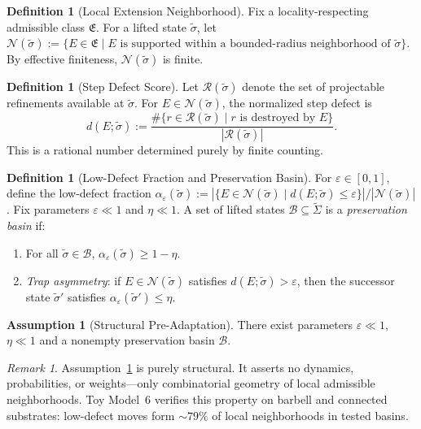 \documentclass[11pt,a4paper]{article}
\theoremstyle{definition}
\newtheorem{definition}[theorem]{Definition}
\newtheorem{assumption}[theorem]{Assumption}
\theoremstyle{remark}
\newtheorem{remark}[theorem]{Remark}
\begin{document}
\begin{definition}[Local Extension Neighborhood]\label{def:neigh}
Fix a locality-respecting admissible class $\mathfrak{E}$. For a lifted state $\tilde{\sigma}$, let $\mathcal{N}(\tilde{\sigma}) := \{ E \in \mathfrak{E} \mid E \text{ is supported within a bounded-radius neighborhood of } \tilde{\sigma} \}$. By effective finiteness, $\mathcal{N}(\tilde{\sigma})$ is finite.
\end{definition}

\begin{definition}[Step Defect Score]\label{def:stepdefect}
Let $\mathcal{R}(\tilde{\sigma})$ denote the set of projectable refinements available at $\tilde{\sigma}$. For $E \in \mathcal{N}(\tilde{\sigma})$, the normalized step defect is
\[
  d(E; \tilde{\sigma}) := \frac{\#\{ r \in \mathcal{R}(\tilde{\sigma}) \mid r \text{ is destroyed by } E \}}{|\mathcal{R}(\tilde{\sigma})|}.
\]
This is a rational number determined purely by finite counting.
\end{definition}

\begin{definition}[Low-Defect Fraction and Preservation Basin]\label{def:basin}
For $\varepsilon \in [0,1]$, define the low-defect fraction $\alpha_\varepsilon(\tilde{\sigma}) := |\{ E \in \mathcal{N}(\tilde{\sigma}) \mid d(E; \tilde{\sigma}) \leq \varepsilon \}| / |\mathcal{N}(\tilde{\sigma})|$. Fix parameters $\varepsilon \ll 1$ and $\eta \ll 1$. A set of lifted states $\mathcal{B} \subseteq \widetilde{\Sigma}$ is a \emph{preservation basin} if:
\begin{enumerate}[label=(\roman*)]
  \item For all $\tilde{\sigma} \in \mathcal{B}$, $\alpha_\varepsilon(\tilde{\sigma}) \geq 1 - \eta$.
  \item \emph{Trap asymmetry}: if $E \in \mathcal{N}(\tilde{\sigma})$ satisfies $d(E; \tilde{\sigma}) > \varepsilon$, then the successor state $\tilde{\sigma}'$ satisfies $\alpha_\varepsilon(\tilde{\sigma}') \leq \eta$.
\end{enumerate}
\end{definition}

\begin{assumption}[Structural Pre-Adaptation]\label{ass:preadapt}
There exist parameters $\varepsilon \ll 1$, $\eta \ll 1$ and a nonempty preservation basin $\mathcal{B}$.
\end{assumption}

\begin{remark}
Assumption~\ref{ass:preadapt} is purely structural. It asserts no dynamics, probabilities, or weights---only combinatorial geometry of local admissible neighborhoods. Toy Model~6 verifies this property on barbell and connected substrates: low-defect moves form ${\sim}79\%$ of local neighborhoods in tested basins.
\end{remark}
\end{document}
